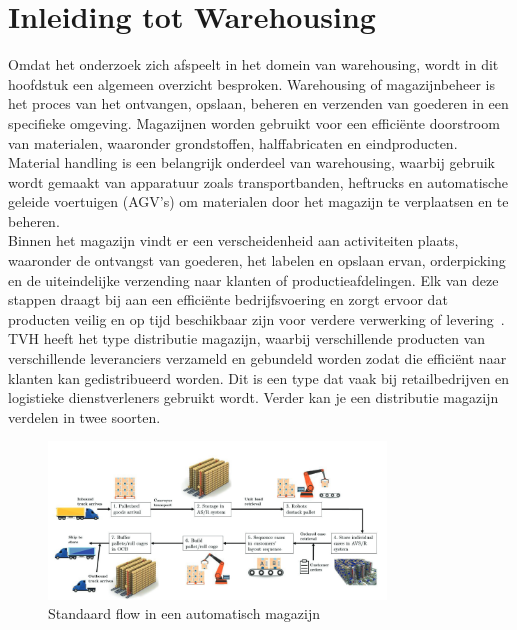 \section{Inleiding tot Warehousing}
Omdat het onderzoek zich afspeelt in het domein van warehousing, wordt in dit hoofdstuk een algemeen overzicht besproken.
Warehousing of magazijnbeheer is het proces van het ontvangen, opslaan, beheren en verzenden van goederen in een specifieke omgeving. 
Magazijnen worden gebruikt voor een efficiënte doorstroom van materialen, waaronder grondstoffen, halffabricaten en eindproducten.
Material handling is een belangrijk onderdeel van warehousing, waarbij gebruik wordt gemaakt van apparatuur zoals 
transportbanden, heftrucks en automatische geleide voertuigen (AGV’s) om materialen door het magazijn te verplaatsen en te beheren.
\\
Binnen het magazijn vindt er een verscheidenheid aan activiteiten plaats, waaronder de ontvangst van goederen, 
het labelen en opslaan ervan, orderpicking en de uiteindelijke verzending naar klanten of productieafdelingen. 
Elk van deze stappen draagt bij aan een efficiënte bedrijfsvoering en zorgt ervoor dat producten veilig en op tijd beschikbaar 
zijn voor verdere verwerking of levering~\autocite{Berg1999}.
\\
TVH heeft het type distributie magazijn, waarbij verschillende producten van verschillende leveranciers verzameld  
en gebundeld worden zodat die efficiënt naar klanten kan gedistribueerd worden. 
Dit is een type dat vaak bij retailbedrijven en logistieke dienstverleners gebruikt wordt.
Verder kan je een distributie magazijn verdelen in twee soorten.

\begin{figure}
  \centering
  \includegraphics[width=0.8\textwidth]{../bachproef/img/warehousing_flow.png}
  \caption[Flow in a typical fully automated warehouse]{\label{fig:warehousing-flow}Standaard flow in een automatisch magazijn~\autocite{Koster2018}}
\end{figure}

